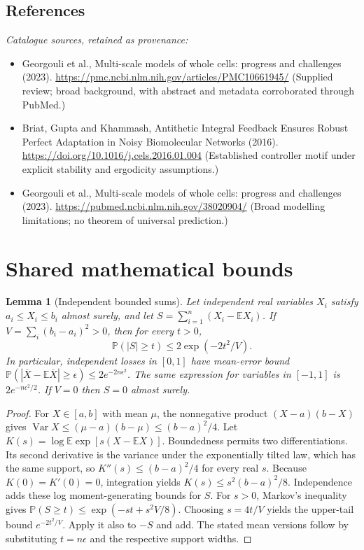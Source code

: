 \documentclass[11pt]{article}
\newcommand{\E}{\mathbb E}
\newcommand{\Prob}{\mathbb P}
\DeclareMathOperator{\Var}{Var}
\providecommand{\E}{\mathbb E}
\providecommand{\Prob}{\mathbb P}
\providecommand{\Var}{\operatorname{Var}}
\newtheorem{sharedlemma}{Lemma}[section]
\begin{document}
\subsection{References}
\noindent\emph{Catalogue sources, retained as provenance:}
\begin{itemize}
\item Georgouli et al., Multi-scale models of whole cells: progress and challenges (2023). \url{https://pmc.ncbi.nlm.nih.gov/articles/PMC10661945/} (Supplied review; broad background, with abstract and metadata corroborated through PubMed.)
\item Briat, Gupta and Khammash, Antithetic Integral Feedback Ensures Robust Perfect Adaptation in Noisy Biomolecular Networks (2016). \url{https://doi.org/10.1016/j.cels.2016.01.004} (Established controller motif under explicit stability and ergodicity assumptions.)
\item Georgouli et al., Multi-scale models of whole cells: progress and challenges (2023). \url{https://pubmed.ncbi.nlm.nih.gov/38020904/} (Broad modelling limitations; no theorem of universal prediction.)
\end{itemize}
\clearpage


\appendix
\section{Shared mathematical bounds}\label{app:bounds}
\begin{sharedlemma}[Independent bounded sums]\label{lem:bounded}
Let independent real variables $X_i$ satisfy $a_i\leq X_i\leq b_i$ almost surely,
and let $S=\sum_{i=1}^n(X_i-\E X_i)$. If
$V=\sum_i(b_i-a_i)^2>0$, then for every $t>0$,
\[
 \Prob(|S|\geq t)\leq 2\exp(-2t^2/V).
\]
In particular, independent losses in $[0,1]$ have mean-error bound
$\Prob(|\overline X-\E\overline X|\geq\epsilon)
\leq2e^{-2n\epsilon^2}$. The same expression for variables in $[-1,1]$
is $2e^{-n\epsilon^2/2}$. If $V=0$ then $S=0$ almost surely.
\end{sharedlemma}
\begin{proof}
For $X\in[a,b]$ with mean $\mu$, the nonnegative product
$(X-a)(b-X)$ gives
$\Var X\leq(\mu-a)(b-\mu)\leq(b-a)^2/4$.
Let $K(s)=\log\E\exp[s(X-\E X)]$.
Boundedness permits two differentiations. Its second derivative is the variance
under the exponentially tilted law, which has the same support, so
$K''(s)\leq(b-a)^2/4$ for every real $s$.
Because $K(0)=K'(0)=0$, integration yields
$K(s)\leq s^2(b-a)^2/8$.
Independence adds these log moment-generating bounds for $S$.
For $s>0$, Markov's inequality gives
$\Prob(S\geq t)\leq\exp(-st+s^2V/8)$.
Choosing $s=4t/V$ yields the upper-tail bound $e^{-2t^2/V}$.
Apply it also to $-S$ and add. The stated mean versions follow by substituting
$t=n\epsilon$ and the respective support widths.
\end{proof}
\end{document}
